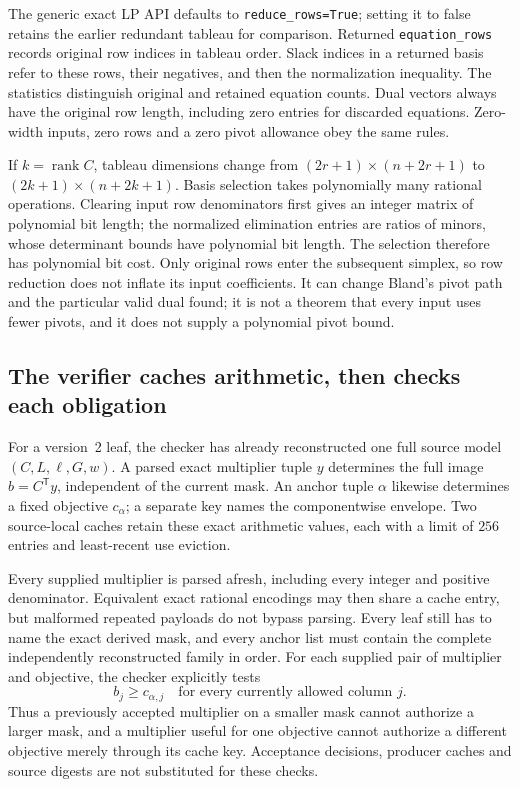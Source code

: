 The generic exact LP API defaults to \texttt{reduce\_rows=True}; setting it
to false retains the earlier redundant tableau for comparison.  Returned
\texttt{equation\_rows} records original row indices in tableau order.  Slack
indices in a returned basis refer to these rows, their negatives, and then
the normalization inequality.  The statistics distinguish original and
retained equation counts.  Dual vectors always have the original row length,
including zero entries for discarded equations.  Zero-width inputs,
zero rows and a zero pivot allowance obey the same rules.

If $k=\operatorname{rank}C$, tableau dimensions change from
$(2r+1)\times(n+2r+1)$ to $(2k+1)\times(n+2k+1)$.  Basis selection takes
polynomially many rational operations.  Clearing input row denominators
first gives an integer matrix of polynomial bit length; the normalized
elimination entries are ratios of minors, whose determinant bounds have
polynomial bit length.  The selection therefore has polynomial bit cost.
Only original rows enter the subsequent simplex, so row reduction does not
inflate its input coefficients.  It can change Bland's pivot path and the
particular valid dual found; it is not a theorem that every input uses fewer
pivots, and it does not supply a polynomial pivot bound.

\subsection{The verifier caches arithmetic, then checks each obligation}

For a version~2 leaf, the checker has already reconstructed one full source
model $(C,L,\ell,G,w)$.  A parsed exact multiplier tuple $y$ determines the
full image $b=C^{\mathsf T}y$, independent of the current mask.  An anchor
tuple $\alpha$ likewise determines a fixed objective $c_\alpha$; a separate
key names the componentwise envelope.  Two source-local caches retain these
exact arithmetic values, each with a limit of $256$ entries and least-recent
use eviction.

Every supplied multiplier is parsed afresh, including every integer and
positive denominator.  Equivalent exact rational encodings may then share
a cache entry, but malformed repeated payloads do not bypass parsing.
Every leaf still has to name the exact derived mask, and every anchor list
must contain the complete independently reconstructed family in order.
For each supplied pair of multiplier and objective, the checker explicitly
tests
\[
 b_j\ge c_{\alpha,j}\quad\text{for every currently allowed column }j.
\]
Thus a previously accepted multiplier on a smaller mask cannot authorize a
larger mask, and a multiplier useful for one objective cannot authorize a
different objective merely through its cache key.  Acceptance decisions,
producer caches and source digests are not substituted for these checks.

